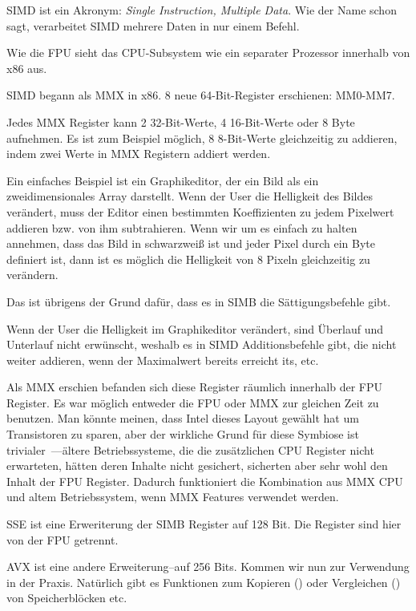 
\label{SIMD_x86}
\ac{SIMD} ist ein Akronym: \emph{Single Instruction, Multiple Data}.
Wie der Name schon sagt, verarbeitet SIMD mehrere Daten in nur einem Befehl.

Wie die \ac{FPU} sieht das \ac{CPU}-Subsystem wie ein separater Prozessor innerhalb von x86 aus.


SIMD begann als MMX in x86. 8 neue 64-Bit-Register erschienen: MM0-MM7.

Jedes MMX Register kann 2 32-Bit-Werte, 4 16-Bit-Werte oder 8 Byte aufnehmen.
Es ist zum Beispiel möglich, 8 8-Bit-Werte gleichzeitig zu addieren, indem zwei Werte in MMX Registern addiert werden.

Ein einfaches Beispiel ist ein Graphikeditor, der ein Bild als ein zweidimensionales Array darstellt.
Wenn der User die Helligkeit des Bildes verändert, muss der Editor einen bestimmten Koeffizienten zu jedem Pixelwert
addieren bzw. von ihm subtrahieren.
Wenn wir um es einfach zu halten annehmen, dass das Bild in schwarzweiß ist und jeder Pixel durch ein Byte definiert
ist, dann ist es möglich die Helligkeit von 8 Pixeln gleichzeitig zu verändern.

Das ist übrigens der Grund dafür, dass es in SIMB die Sättigungsbefehle gibt.

Wenn der User die Helligkeit im Graphikeditor verändert, sind Überlauf und Unterlauf nicht erwünscht, weshalb es in SIMD
Additionsbefehle gibt, die nicht weiter addieren, wenn der Maximalwert bereits erreicht its, etc.

Als MMX erschien befanden sich diese Register räumlich innerhalb der FPU Register.
Es war möglich entweder die FPU oder MMX zur gleichen Zeit zu benutzen. Man könnte meinen, dass Intel dieses Layout
gewählt hat um Transistoren zu sparen, aber der wirkliche Grund für diese Symbiose ist trivialer~---ältere
Betriebssysteme, die die zusätzlichen CPU Register nicht erwarteten, hätten deren Inhalte nicht gesichert, sicherten
aber sehr wohl den Inhalt der FPU Register.
Dadurch funktioniert die Kombination aus MMX CPU und altem Betriebssystem, wenn MMX Features verwendet werden. 

SSE ist eine Erweriterung der SIMB Register auf 128 Bit. Die Register sind hier von der FPU getrennt.

AVX ist eine andere Erweiterung--auf 256 Bits.
Kommen wir nun zur Verwendung in der Praxis.
Natürlich gibt es Funktionen zum Kopieren () oder Vergleichen () von Speicherblöcken etc.

